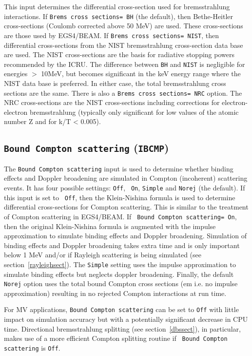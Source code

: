 \documentclass[12pt,twoside]{article}
\begin{document}
This input determines the differential cross-section used for
bremsstrahlung interactions.  If {\tt Brems cross sections= BH} (the
default), then Bethe-Heitler cross-sections (Coulomb corrected above
50 MeV)\cite{KM59} are used.  These cross-sections are those used by
EGS4/BEAM.  If {\tt Brems cross sections= NIST}, then differential
cross-sections from the NIST bremsstrahlung cross-section data
base\cite{SB85,SB86a} are used.  The NIST cross-sections are the basis
for radiative stopping powers recommended by the ICRU\cite{ICRU37}.
The difference between {\tt BH} and {\tt NIST} is negligible for energies
$>$ 10MeV, but becomes significant in the keV energy range where the
NIST data base is preferred. In either case, the total bremsstrahlung
cross sections are the same.  There is also
a {\tt Brems cross sections= NRC} option.  The NRC cross-sections
are the NIST cross-sections including corrections for electron-electron
bremsstrahlung (typically only
significant for low values of the atomic number Z and for k/T < 0.005).

\subsection{ {\tt Bound Compton scattering} ({\tt IBCMP})}
\label{bcsect}

The {\tt Bound Compton scattering} input is used to determine whether
binding effects and Doppler broadening are simulated in Compton
(incoherent) scattering events.  It has four possible settings: {\tt Off}, {\tt
On}, {\tt Simple} and {\tt Norej} (the default). If this input is set to {\tt
Off}, then the Klein-Nishina formula\cite{KN29} is used to
determine differential cross-sections for Compton scattering.  This is
similar to the treatment of Compton scattering in EGS4/BEAM.  If {\tt
Bound Compton scattering= On}, then the original Klein-Nishina formula is
augmented with the impulse approximation\cite{Ri75} to simulate binding
effects and Doppler broadening.  Simulation of binding effects and Doppler
broadening takes extra time and is only important below 1 MeV and/or if
Rayleigh scattering is being simulated (see section~\ref{rayleighsect}).
The {\tt Simple} setting uses the impulse approximation to simulate binding
effects but neglects doppler broadening.  Finally, the default {\tt Norej}
option uses the total bound Compton cross sections ({em i.e.} no impulse
approximation) resulting in no rejected Compton interactions at run time.

For MV applications, {\tt Bound Compton scattering} can be set to {\tt Off} with
little impact on simulation accuracy but with a potentially significant decrease
in CPU time.  Directional bremsstrahlung splitting (see section~\ref{dbssect}),
in particular, makes use of a more efficient Compton splitting routine if {\tt
Bound Compton scattering} is {\tt Off}.
\end{document}
